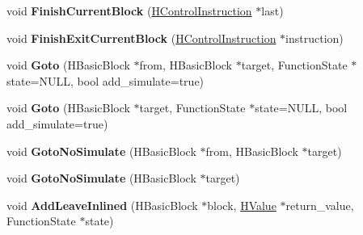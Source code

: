 \begin{DoxyCompactItemize}
\item 
\hypertarget{classv8_1_1internal_1_1_h_graph_builder_afc18fd7c42bb215f4011e5ffcdc6f2c6}{}void {\bfseries Finish\+Current\+Block} (\hyperlink{classv8_1_1internal_1_1_h_control_instruction}{H\+Control\+Instruction} $\ast$last)\label{classv8_1_1internal_1_1_h_graph_builder_afc18fd7c42bb215f4011e5ffcdc6f2c6}

\item 
\hypertarget{classv8_1_1internal_1_1_h_graph_builder_aa9124a49444198fd4191b3c19e3ddf8c}{}void {\bfseries Finish\+Exit\+Current\+Block} (\hyperlink{classv8_1_1internal_1_1_h_control_instruction}{H\+Control\+Instruction} $\ast$instruction)\label{classv8_1_1internal_1_1_h_graph_builder_aa9124a49444198fd4191b3c19e3ddf8c}

\item 
\hypertarget{classv8_1_1internal_1_1_h_graph_builder_a876abe12fa00ec9814d67070fa5ecb65}{}void {\bfseries Goto} (H\+Basic\+Block $\ast$from, H\+Basic\+Block $\ast$target, Function\+State $\ast$state=N\+U\+L\+L, bool add\+\_\+simulate=true)\label{classv8_1_1internal_1_1_h_graph_builder_a876abe12fa00ec9814d67070fa5ecb65}

\item 
\hypertarget{classv8_1_1internal_1_1_h_graph_builder_afb6d8a887251a6f3df75da20e0890140}{}void {\bfseries Goto} (H\+Basic\+Block $\ast$target, Function\+State $\ast$state=N\+U\+L\+L, bool add\+\_\+simulate=true)\label{classv8_1_1internal_1_1_h_graph_builder_afb6d8a887251a6f3df75da20e0890140}

\item 
\hypertarget{classv8_1_1internal_1_1_h_graph_builder_a404c0c32a2cf8f2ea1f4f82a6232b3c3}{}void {\bfseries Goto\+No\+Simulate} (H\+Basic\+Block $\ast$from, H\+Basic\+Block $\ast$target)\label{classv8_1_1internal_1_1_h_graph_builder_a404c0c32a2cf8f2ea1f4f82a6232b3c3}

\item 
\hypertarget{classv8_1_1internal_1_1_h_graph_builder_a4564168b5850b52312084777addc961c}{}void {\bfseries Goto\+No\+Simulate} (H\+Basic\+Block $\ast$target)\label{classv8_1_1internal_1_1_h_graph_builder_a4564168b5850b52312084777addc961c}

\item 
\hypertarget{classv8_1_1internal_1_1_h_graph_builder_af52a2feef21c80ffd1f0d767e7ab64b3}{}void {\bfseries Add\+Leave\+Inlined} (H\+Basic\+Block $\ast$block, \hyperlink{classv8_1_1internal_1_1_h_value}{H\+Value} $\ast$return\+\_\+value, Function\+State $\ast$state)\label{classv8_1_1internal_1_1_h_graph_builder_af52a2feef21c80ffd1f0d767e7ab64b3}


\end{DoxyCompactItemize}
